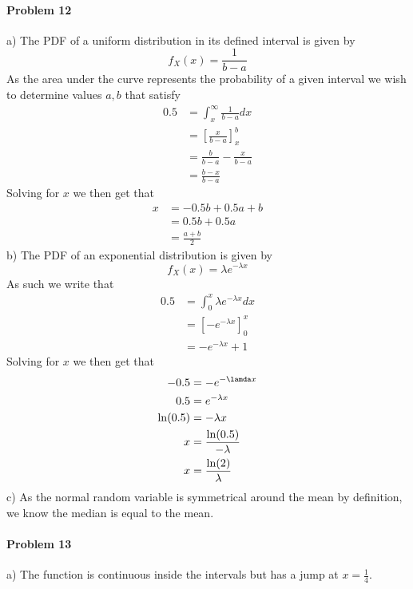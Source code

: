 \paragraph{Problem 12}
a)
The PDF of a uniform distribution in its defined interval is given by
\[
    f_{X}(x)=\frac{1}{b-a}
\]
As the area under the curve represents the probability of a given interval we wish to determine values $a,b$ that satisfy
\begin{align*}
    0.5&=\int_{x}^{\infty}\frac{1}{b-a}dx \\
       &=\left[\frac{x}{b-a}\right]_{x}^{b} \\
       &=\frac{b}{b-a}-\frac{x}{b-a} \\
       &=\frac{b-x}{b-a}
\end{align*}
Solving for $x$ we then get that
\begin{align*}
    x&=-0.5b+0.5a+b \\
     &=0.5b+0.5a \\
     &=\frac{a+b}{2}
\end{align*}
b)
The PDF of an exponential distribution is given by
\[
    f_{X}(x)=\lambda e^{-\lambda x}
\]
As such we write that
\begin{align*}
    0.5&=\int_{0}^{x}\lambda e^{-\lambda x}dx \\
       &=\left[-e^{-\lambda x}\right]_{0}^{x} \\
       &=-e^{-\lambda x}+1
\end{align*}    
Solving for $x$ we then get that
\begin{align*}
    -0.5&=-e^{-\lamda x} \\
    0.5&=e^{-\lambda x} \\
    \ln(0.5)&=-\lambda x \\
    x&=\frac{\ln(0.5)}{-\lambda} \\
    x&=\frac{\ln(2)}{\lambda}
\end{align*}
c)
As the normal random variable is symmetrical around the mean by definition, we know the median is equal to the mean.
\paragraph{Problem 13}
a)
The function is continuous inside the intervals but has a jump at $x=\frac{1}{4}$.

